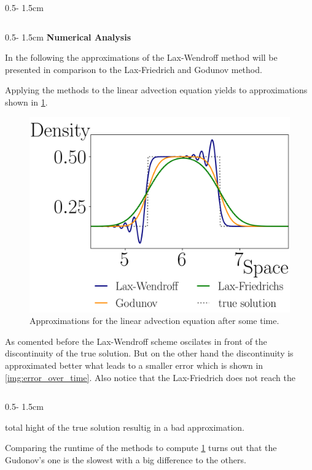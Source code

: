 \documentclass{uibposter}
\begin{document}
\begin{frame}[fragile]
\begin{columns}
\begin{column}{0.5\textwidth - 1.5cm}
\begin{column}{0.5\textwidth - 1.5cm}
\vspace{0.5cm}
\textbf{Numerical Analysis}
\vspace{0.5cm}
    
In the following the approximations of the Lax-Wendroff method will be presented in comparison to the Lax-Friedrich and Godunov method.

\vspace{0.5cm}
Applying the methods to the linear advection equation yields to approximations shown in \cref{img:linar_comprehension}. 

\begin{figure}[h]
	\includegraphics{fig/linear_compare.png}
	\caption{Approximations for the linear advection equation after some time.}
	\label{img:linar_comprehension}
\end{figure}

As comented before the Lax-Wendroff scheme oscilates in front of the discontinuity of the true solution. But on the other hand the discontinuity is approximated better what leads to a smaller error which is shown in \cref{img:error_over_time}. Also notice that the Lax-Friedrich does not reach the 
 
\end{column}
\begin{column}{0.5\textwidth - 1.5cm}
	\vspace*{-1.7cm} 
	
total hight of the true solution resultig in a bad approximation. 

Comparing the runtime of the methods to compute \cref{img:linar_comprehension} turns out that the Gudonov's one is the slowest with a big difference to the others.


\end{column}
\end{column}
\end{columns}
\end{frame}
\end{document}
